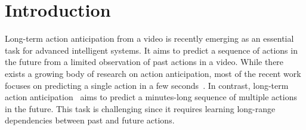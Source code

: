 
\vspace{-4mm}
\section{Introduction}
Long-term action anticipation from a video is recently emerging as an essential task for advanced intelligent systems. It aims to predict a sequence of actions in the future from a limited observation of past actions in a video.
While there exists a growing body of research on action anticipation, most of the recent work focuses on predicting a single action in a few seconds~\cite{furnari2019would,miech2019leveraging,fernando2021anticipating,girdhar2021anticipative,sener2020temporal,gammulle2019predicting,sener2019zero, roy2021action}. In contrast, long-term action anticipation~\cite{abu2018will,farha2020long,ke2019time,sener2020temporal} aims to predict a minutes-long sequence of multiple actions in the future. 
This task is challenging since it requires learning long-range dependencies between past and future actions.

